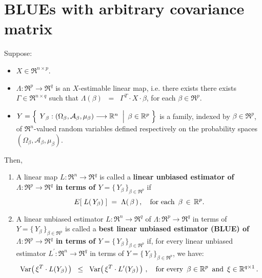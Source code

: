 

\section{BLUEs with arbitrary covariance matrix}
\setcounter{theorem}{0}
\setcounter{equation}{0}

\renewcommand{\theenumi}{\roman{enumi}}
\renewcommand{\labelenumi}{\textnormal{(\theenumi)}$\;\;$}


\begin{definition}
\mbox{}\vskip 0.1cm\noindent
Suppose:
\begin{itemize}
\item
	$X \in \Re^{n \times p}$.
\item
	$\Lambda : \Re^{p} \longrightarrow \Re^{q}$ is an $X$-estimable linear map,
	i.e. there exists there exists $\Gamma \in \Re^{n \times q}$ such that
	$\Lambda(\beta) \;\; =\;\; \Gamma^{T} \cdot X \cdot \beta$,
	for each $\beta \in \Re^{p}$.
\item
	$Y = \left\{\;
		\left.
		\overset{{\color{white}.}}{Y}_{\beta} : (\Omega_{\beta},\mathcal{A}_{\beta},\mu_{\beta}) \longrightarrow \Re^{n}
		\;\;\right\vert\;
		\beta \in \Re^{p}
		\;\right\}$
	is a family, indexed by $\beta \in \Re^{p}$,
	of $\Re^{n}$-valued random variables defined respectively on the
	probability spaces $(\Omega_{\beta},\mathcal{A}_{\beta},\mu_{\beta})$.
\end{itemize}
Then,
\begin{enumerate}
\item
	A linear map $L : \Re^{n} \longrightarrow \Re^{q}$ is called a
	{\color{red}\textbf{linear unbiased estimator of
	$\Lambda : \Re^{p} \longrightarrow \Re^{q}$
	in terms of $Y = \{\,Y_{\beta}\,\}_{\beta\in\Re^{p}}$}} if
	\begin{equation*}
	E\!\left[\;L(\,Y_{\beta})\;\right] \;=\; \Lambda(\,\beta\,)\,,
	\quad
	\textnormal{for each \,$\beta \,\in\, \Re^{p}$}.
	\end{equation*}
\item
	A linear unbiased estimator $L : \Re^{n} \longrightarrow \Re^{q}$
	of $\Lambda : \Re^{p} \longrightarrow \Re^{q}$
	in terms of $Y = \{\,Y_{\beta}\,\}_{\beta\in\Re^{p}}$
	is called a
	{\color{red}\textbf{best linear unbiased estimator (BLUE) of
	$\Lambda : \Re^{p} \longrightarrow \Re^{q}$ in terms of $Y = \{\,Y_{\beta}\,\}_{\beta\in\Re^{p}}$}}
	if, for every linear unbiased estimator $L^{\prime} : \Re^{n} \longrightarrow \Re^{q}$
	in terms of $Y = \{\,Y_{\beta}\,\}_{\beta\in\Re^{p}}$, we have:
	\begin{equation*}
	\Var\!\left(\,\xi^{T} \cdot L(Y_{\beta})\,\right)
	\;\; \leq \;\;
		\Var\!\left(\,\xi^{T} \cdot L^{\prime}(Y_{\beta})\,\right)\,,
	\quad
	\textnormal{for every \,$\beta \in \Re^{p}$\, and \,$\xi \in \Re^{q \times 1}$}\,.
	\end{equation*}
\end{enumerate}
\end{definition}


